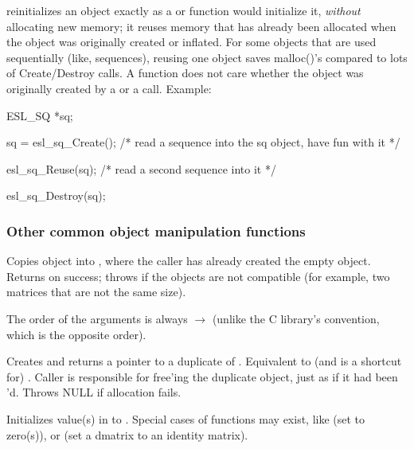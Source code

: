 \begin{sreitems}{}
\item [\ccode{Reuse}] 
    reinitializes an object exactly as a
    or  function would initialize it, \emph{without}
   allocating new memory; it reuses memory that has
   already been allocated when the object was originally created or
   inflated. For some objects that are used sequentially (like,
   sequences), reusing one object saves malloc()'s compared to
   lots of Create/Destroy calls. A  function does not
   care whether the object was originally created by a 
   or a  call. Example:

\begin{cchunk}
ESL_SQ *sq;

sq = esl_sq_Create();
  /* read a sequence into the sq object, have fun with it */

esl_sq_Reuse(sq);
  /* read a second sequence into it */

esl_sq_Destroy(sq);
\end{cchunk}

\end{sreitems}

\subsubsection{Other common object manipulation functions}

\begin{sreitems}{}

\item[\ccode{\_Copy(src, dest)}]
Copies  object into , where the caller has
already created the empty  object. Returns 
on success; throws  if the objects are not
compatible (for example, two matrices that are not the same size).

The order of the arguments is always  $\rightarrow$
 (unlike the C library's  convention, which
is the opposite order).

\item[\ccode{\_Duplicate(obj)}] 

Creates and returns a pointer to a duplicate of .
Equivalent to (and is a shortcut for) . Caller is responsible for free'ing the duplicate
object, just as if it had been 'd. Throws NULL if
allocation fails.

\item[\ccode{\_Set*(obj, value...)}]

Initializes value(s) in  to . Special cases of
 functions may exist, like  (set to
zero(s)), or  (set a dmatrix to an
identity matrix).

\end{sreitems}


